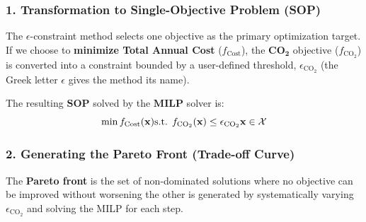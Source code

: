 \documentclass[11pt,a4paper]{report}
\begin{document}
\subsubsection*{1. Transformation to Single-Objective Problem (SOP)}

The $\epsilon$-constraint method selects one objective as the primary optimization target.
If we choose to \textbf{minimize Total Annual Cost} ($f_{\text{Cost}}$), the $\mathbf{CO_2}$ objective ($f_{\text{CO}_2}$) is converted into a constraint bounded by a user-defined threshold, $\epsilon_{\text{CO}_2}$ (the Greek letter $\epsilon$ gives the method its name).

The resulting $\mathbf{SOP}$ solved by the $\mathbf{MILP}$ solver is:
$$
\min f_{\text{Cost}}(\mathbf{x}) \\
\text{s.t. } f_{\text{CO}_2}(\mathbf{x}) \leq \epsilon_{\text{CO}_2} \\
\mathbf{x} \in \mathcal{X}
$$

\subsubsection*{2. Generating the Pareto Front (Trade-off Curve)}

The \textbf{Pareto front} is the set of non-dominated solutions where no objective can be improved without worsening the other is generated by systematically varying $\epsilon_{\text{CO}_2}$ and solving the MILP for each step.
\end{document}
